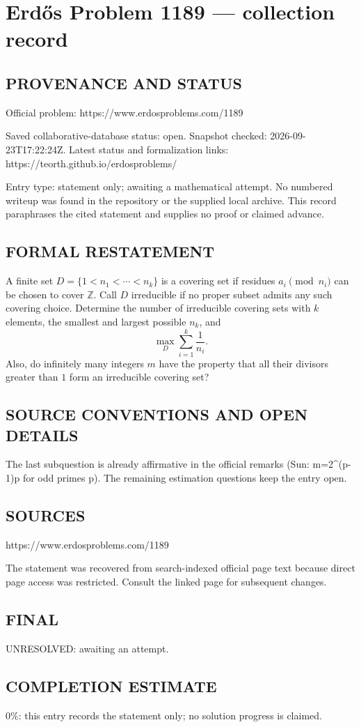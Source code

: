 \section*{Erd\H{o}s Problem 1189 --- collection record}

\subsection*{PROVENANCE AND STATUS}
Official problem: https://www.erdosproblems.com/1189

Saved collaborative-database status: open.
Snapshot checked: 2026-09-23T17:22:24Z.
Latest status and formalization links: https://teorth.github.io/erdosproblems/

Entry type: statement only; awaiting a mathematical attempt. No numbered writeup was found in the repository or the supplied local archive. This record paraphrases the cited statement and supplies no proof or claimed advance.

\subsection*{FORMAL RESTATEMENT}
A finite set $D=\{1<n_1<\cdots<n_k\}$ is a covering set if residues $a_i\pmod{n_i}$ can be chosen to cover $\mathbb Z$. Call $D$ irreducible if no proper subset admits any such covering choice. Determine the number of irreducible covering sets with $k$ elements, the smallest and largest possible $n_k$, and
\[\max_D\sum_{i=1}^k\frac1{n_i}.\]
Also, do infinitely many integers $m$ have the property that all their divisors greater than $1$ form an irreducible covering set?

\subsection*{SOURCE CONVENTIONS AND OPEN DETAILS}
The last subquestion is already affirmative in the official remarks (Sun: m=2^(p-1)p for odd primes p). The remaining estimation questions keep the entry open.

\subsection*{SOURCES}
https://www.erdosproblems.com/1189

The statement was recovered from search-indexed official page text because direct page access was restricted. Consult the linked page for subsequent changes.

\subsection*{FINAL}
UNRESOLVED: awaiting an attempt.

\subsection*{COMPLETION ESTIMATE}
$0\%$: this entry records the statement only; no solution progress is claimed.
